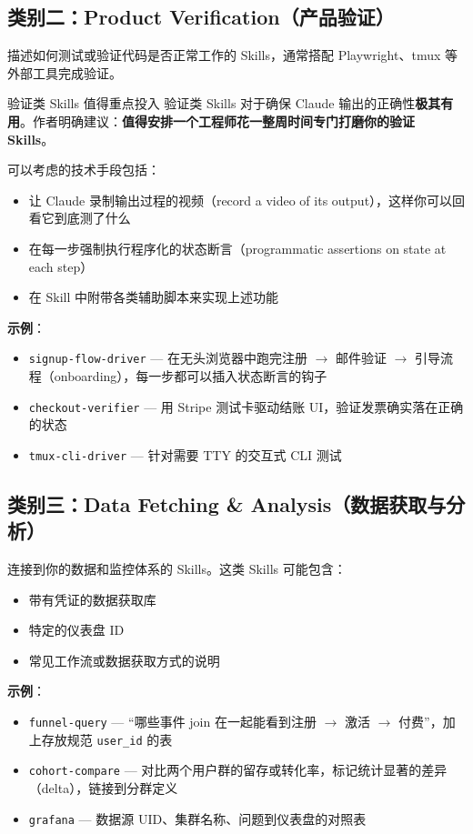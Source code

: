 \documentclass[a4paper]{article}
\begin{document}
\subsection{类别二：Product Verification（产品验证）}

描述如何测试或验证代码是否正常工作的 Skills，通常搭配 Playwright、tmux 等外部工具完成验证。

\begin{knowledgebox}{验证类 Skills 值得重点投入}
验证类 Skills 对于确保 Claude 输出的正确性\textbf{极其有用}。作者明确建议：\textbf{值得安排一个工程师花一整周时间专门打磨你的验证 Skills}。

可以考虑的技术手段包括：
\begin{itemize}
    \item 让 Claude 录制输出过程的视频（record a video of its output），这样你可以回看它到底测了什么
    \item 在每一步强制执行程序化的状态断言（programmatic assertions on state at each step）
    \item 在 Skill 中附带各类辅助脚本来实现上述功能
\end{itemize}
\end{knowledgebox}

\textbf{示例}：
\begin{itemize}
    \item \texttt{signup-flow-driver} --- 在无头浏览器中跑完注册 $\to$ 邮件验证 $\to$ 引导流程（onboarding），每一步都可以插入状态断言的钩子
    \item \texttt{checkout-verifier} --- 用 Stripe 测试卡驱动结账 UI，验证发票确实落在正确的状态
    \item \texttt{tmux-cli-driver} --- 针对需要 TTY 的交互式 CLI 测试
\end{itemize}

\subsection{类别三：Data Fetching \& Analysis（数据获取与分析）}

连接到你的数据和监控体系的 Skills。这类 Skills 可能包含：
\begin{itemize}
    \item 带有凭证的数据获取库
    \item 特定的仪表盘 ID
    \item 常见工作流或数据获取方式的说明
\end{itemize}

\textbf{示例}：
\begin{itemize}
    \item \texttt{funnel-query} --- ``哪些事件 join 在一起能看到注册 $\to$ 激活 $\to$ 付费''，加上存放规范 \texttt{user\_id} 的表
    \item \texttt{cohort-compare} --- 对比两个用户群的留存或转化率，标记统计显著的差异（delta），链接到分群定义
    \item \texttt{grafana} --- 数据源 UID、集群名称、问题到仪表盘的对照表
\end{itemize}
\end{document}
